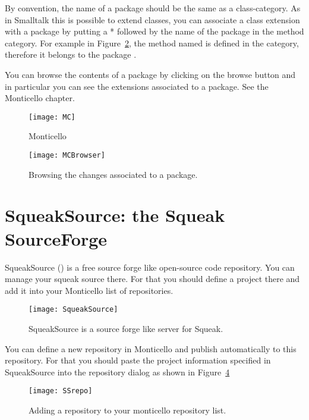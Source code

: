 By convention, the name of a package should be the same as a class-category. As in Smalltalk this is possible to extend classes, you can associate a class extension with a package by putting a * followed by the name of the package in the method category. For example in Figure~\ref{mcbrowser}, the method named  is defined in the  category, therefore it belongs to the package .

You can browse the contents of a package by clicking on the browse button and in particular  you can see the extensions associated to a package. See the Monticello chapter. 

\begin{figure}[h]
\begin{center}
\texttt{[image: MC]}
\caption{Monticello \label{}}
\end{center}
\end{figure}

\begin{figure}[h]
\begin{center}
\texttt{[image: MCBrowser]}
\caption{Browsing the changes associated to a package. \label{mcbrowser}}
\end{center}
\end{figure}

\section{SqueakSource: the Squeak SourceForge}

SqueakSource () is a free source forge like open-source code repository. You can manage your squeak source there. For that you should define a project there and add it into your Monticello list of repositories. 

\begin{figure}[h]
\begin{center}
\texttt{[image: SqueakSource]}
\caption{SqueakSource is a source forge like server for Squeak.\label{}}
\end{center}
\end{figure}

You can define a new repository in Monticello and publish automatically to this repository.
For that you should paste the project information specified in SqueakSource into the repository dialog as shown in Figure~\ref{SSrepo}
\begin{figure}[h]
\begin{center}
\texttt{[image: SSrepo]}
\caption{Adding a repository to your monticello repository list.\label{SSrepo}}
\end{center}
\end{figure}


